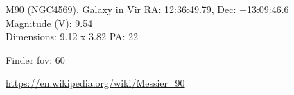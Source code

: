 \begin{block}{M90 (NGC4569), Galaxy in Vir}
    RA: 12:36:49.79, Dec: +13:09:46.6 \\ 
    Magnitude (V): 9.54 \\ 
    Dimensions: 9.12 x 3.82 PA: 22 

    Finder fov: 60 

    \url{https://en.wikipedia.org/wiki/Messier_90} 
\end{block}